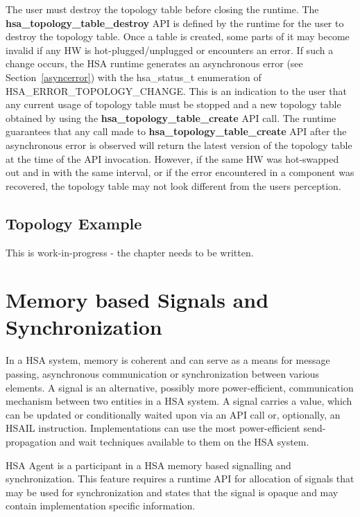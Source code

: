 \documentclass{book}
\newcommand{\reffun}[1]{\textbf{#1}}
\newcommand{\reftyp}[1]{#1}
\newcommand{\refenu}[1]{\reftyp{#1}}
\begin{document}
The user must destroy the topology table before closing the runtime.
The \reffun{hsa\_topology\_table\_destroy} API is defined by the
runtime for the user to destroy the topology table. Once a table is
created, some parts of it may become invalid if any HW is
hot-plugged/unplugged or encounters an error. If such a change
occurs, the HSA runtime generates an asynchronous error (see
Section~\ref{asyncerror}) with the \reftyp{hsa\_status\_t} enumeration
of \refenu{HSA\_ERROR\_TOPOLOGY\_CHANGE}. This is an indication to the
user that any current usage of topology table must be stopped and a
new topology table obtained by using the
\reffun{hsa\_topology\_table\_create} API call. The runtime guarantees
that any call made to \reffun{hsa\_topology\_table\_create} API after
the asynchronous error is observed will return the latest version of
the topology table at the time of the API invocation. However, if
the same HW was hot-swapped out and in with the same interval, or if
the error encountered in a component was recovered, the topology
table may not look different from the users perception.

\hypertarget{topology_example}{} \subsection{Topology Example}
This is {\color{red} work-in-progress} - the chapter needs to be written.


\hypertarget{signals}{}\section{Memory based Signals and
Synchronization}\label{signals}

In a HSA system, memory is coherent and can serve as a means for
message passing, asynchronous communication or synchronization
between various elements.  A signal is an alternative, possibly more
power-efficient, communication mechanism between two entities in a
HSA system. A signal carries a value, which can be updated or
conditionally waited upon via an API call or, optionally, an HSAIL
instruction. Implementations can use the most power-efficient send-propagation
and wait techniques available to them on the  HSA system.

HSA Agent is a participant in a HSA memory based signalling and
synchronization.  This feature requires a runtime API for allocation
of signals that may be used for synchronization and states that the
signal is opaque and may contain implementation specific information.
\end{document}
